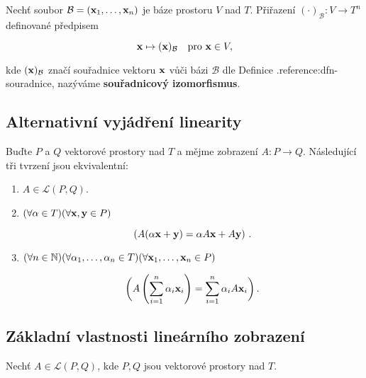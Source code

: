 Nechť soubor $\mathcal B=(\mathbf{x}_1,\dots,\mathbf{x}_n)$ je báze prostoru $V$ nad $T$.
Přiřazení $(\cdot)_{\mathcal B}:V\to T^n$ definované předpisem

\[ \mathbf{x}\mapsto (\mathbf{x})_{\mathcal B} \quad \text{pro } \mathbf{x}\in V, \]

\noindent kde $(\mathbf{x})_{\mathcal B}$ značí souřadnice vektoru $\mathbf{x}$ vůči bázi $\mathcal B$
dle Definice .reference:dfn-souradnice, nazýváme \textbf{souřadnicový
    izomorfismus}.

\subsection*{Alternativní vyjádření linearity}

Buďte $P$ a $Q$ vektorové prostory nad $T$ a mějme zobrazení $A:P\rightarrow
    Q$. Následující tři tvrzení jsou ekvivalentní:

\begin{enumerate}
    \item $A\in\mathcal L(P,Q)$.
    \item $(\forall \alpha\in T)(\forall \mathbf{x},\mathbf{y}\in P)$

          \[ \left(A(\alpha \mathbf{x}+ \mathbf{y})=\alpha A\mathbf{x}+ A\mathbf{y}\right)\,. \]

    \item $(\forall n\in\mathbb{N})(\forall \alpha_{1},\dots,\alpha_{n}\in T)(\forall \mathbf{x}_{1},\dots, \mathbf{x}_{n}\in P)$

          \[ \bigg(A\left(\sum_{i=1}^{n}\alpha_{i}\mathbf{x}_{i}\right)=\sum_{i=1}^{n}\alpha_{i}A\mathbf{x}_{i}\bigg)\,. \]

\end{enumerate}

\subsection*{Základní vlastnosti lineárního zobrazení}

Nechť $A\in\mathcal L(P,Q)$, kde $P,Q$ jsou vektorové prostory nad $T$.


